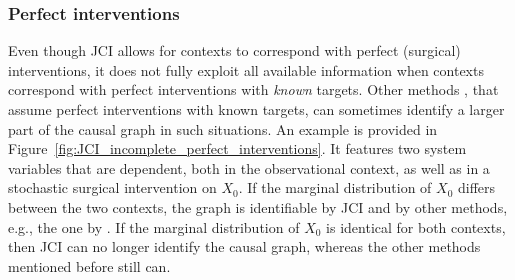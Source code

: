 \documentclass[twoside,11pt]{article}
\begin{document}

\subsubsection{Perfect interventions}
Even though JCI allows for contexts to correspond with perfect (surgical) interventions, it does not fully exploit all available information when contexts correspond with perfect interventions with \emph{known} targets.
Other methods \citep[e.g.,][]{HEJ2014,triantafillou2015constraint,ForreMooij_UAI_18}, that assume perfect interventions with known targets, can sometimes identify a larger part of the causal graph in such situations.
An example is provided in Figure~\ref{fig:JCI_incomplete_perfect_interventions}. It features two system variables that are dependent, both in the observational context, as well as in a stochastic surgical intervention on $X_0$. If the marginal distribution of $X_0$ differs between the two contexts, the graph is identifiable by JCI and by other methods, e.g., the one by \citet{HEJ2014}. If the marginal distribution of $X_0$ is identical for both contexts, then JCI can no longer identify the causal graph, whereas the other methods mentioned before still can.
\end{document}
